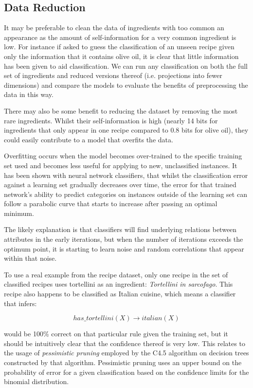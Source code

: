 \documentclass[11pt,a4paper]{article}
\begin{document}
\subsection{Data Reduction}
\label{sec:data-reduction}
It may be preferable to clean the data of ingredients
with too common an appearance as the amount of
self-information \cite{reza1961introduction} for a very common ingredient is low. For
instance if asked to guess the classification of an unseen recipe given only
the information that it contains olive oil, it is clear that little information
has been given to aid classification. We can run any classification on
both the full set of ingredients
and reduced versions thereof (i.e. projections into fewer dimensions) and compare
the models to evaluate the benefits of preprocessing the data in this way.

There may also be some benefit to reducing the dataset by removing the most rare
ingredients. Whilst their self-information is high (nearly 14 bits for ingredients
that only appear in one recipe compared to 0.8 bits for olive oil), they could
easily contribute to a model that overfits the data.

Overfitting occurs when the model becomes over-trained to the specific training set
used and becomes less useful for applying to new, unclassified instances. It has
been shown \cite{tetko1995neural} with neural network classifiers, that whilst the
classification error against a learning set gradually decreases over time, the
error for that trained network's ability to predict categories on instances outside of the
learning set can follow a parabolic curve that starts to increase after passing an
optimal minimum.

The likely explanation \cite{tetko1995neural} is that classifiers will find underlying
relations between attributes in the early iterations, but when the number of iterations
exceeds the optimum point, it is starting to learn noise and random correlations that
appear within that noise.

To use a real example from the recipe dataset, only one recipe in the set of
classified recipes uses tortellini as an ingredient: \emph{Tortellini in sarcofago}.
This recipe also happens to be classified as Italian cuisine, which means a classifier
that infers:

\begin{equation} \label{tortellini-rule}
has\_tortellini(X) \to italian(X)
\end{equation}

\noindent would be 100\% correct on that particular
rule given the training set, but it should be intuitively clear that the confidence
thereof is very low. This relates to the usage of \emph{pessimistic pruning} employed
by the C4.5 algorithm \cite{quinlan1993c4} on decision trees constructed by that algorithm.
Pessimistic pruning uses an upper bound on the probability of error for a given classification
based on the confidence limits for the binomial distribution.
\end{document}
